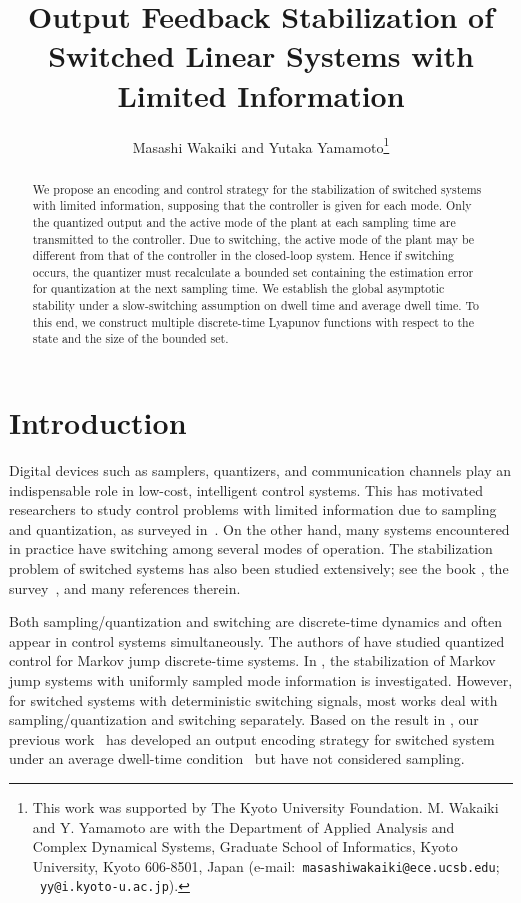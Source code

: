 \documentclass[letterpaper, 11pt, onecolumn]{ieeeconf}  \IEEEoverridecommandlockouts
\title{\LARGE \bf
Output Feedback Stabilization of Switched Linear Systems with Limited Information
}
\author{Masashi Wakaiki and Yutaka Yamamoto\thanks{
This work was supported by The Kyoto University Foundation.
M. Wakaiki and Y. Yamamoto are with the Department of Applied Analysis and Complex
Dynamical Systems, Graduate School of Informatics, Kyoto University, Kyoto
606-8501, Japan
(e-mail:{\tt  \ masashiwakaiki@ece.ucsb.edu};
{\tt \ yy@i.kyoto-u.ac.jp}).}}
\begin{document}
\maketitle
\thispagestyle{empty}
\pagestyle{empty}
\begin{abstract}                We propose an encoding and control strategy for 
the stabilization of switched systems with limited information, 
supposing that the controller is given for each mode.
Only the quantized output and the active mode of the plant 
at each sampling time are transmitted to the controller. 
Due to switching,
the active mode of the plant may be different from that of the controller
in the closed-loop system.
Hence if switching occurs, 
the quantizer must recalculate a bounded set containing the estimation error
for quantization at the next sampling time.
We establish the global asymptotic stability
under a slow-switching assumption on dwell time and average dwell time.
To this end, we construct multiple discrete-time Lyapunov functions with
respect to the state and the size of the bounded set.
\end{abstract}

\section{Introduction}
Digital devices such as samplers, quantizers, and communication channels
play an indispensable role in low-cost, intelligent control systems.
This has motivated researchers to study control problems 
with limited information
due to sampling and quantization, 
as surveyed in~\cite{Nair2007,Hepsanha2007, Ishii2012}.
On the other hand, many systems encountered in practice have switching among
several modes of operation.
The stabilization problem of switched systems has also been studied 
extensively; see the book \cite{Liberzon2003Book},
the survey~\cite{Shorten2007, Lin2009}, and many references therein.

Both sampling/quantization and switching are
discrete-time dynamics and often appear in control systems simultaneously.
The authors of
\cite{Nair2003, Ling2010, Xiao2010, Xu2013} have studied 
quantized control for Markov jump discrete-time systems.
In \cite{Cetinkaya2012}, the stabilization of
Markov jump systems with uniformly sampled mode information is investigated.
However,  for switched systems with deterministic switching signals, 
most works deal with sampling/quantization and switching separately.
Based on the result in \cite{Liberzon2003Automatica},
our previous work~\cite{WakaikiMTNS2014} has developed 
an output encoding strategy for switched system
under an average dwell-time condition~\cite{Hespanha1999CDC} but
have not considered sampling.
\end{document}
